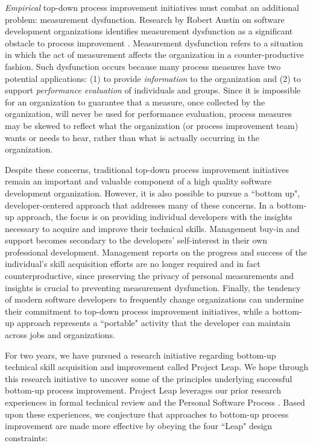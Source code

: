 {\em Empirical} top-down process improvement initiatives must combat an
additional problem: measurement dysfunction.  Research by Robert Austin on
software development organizations identifies measurement dysfunction as a
significant obstacle to process improvement \cite{Austin96}.  Measurement
dysfunction refers to a situation in which the act of measurement affects
the organization in a counter-productive fashion.  Such dysfunction occurs
because many process measures have two potential applications: (1) to
provide {\em information} to the organization and (2) to support {\em
  performance evaluation} of individuals and groups.  Since it is
impossible for an organization to guarantee that a measure, once collected
by the organization, will never be used for performance evaluation, process
measures may be skewed to reflect what the organization (or process
improvement team) wants or needs to hear, rather than what is actually
occurring in the organization.


Despite these concerns, traditional top-down process improvement
initiatives remain an important and valuable component of a high quality
software development organization.  However, it is also possible to pursue
a ``bottom up", developer-centered approach that addresses many of these
concerns. In a bottom-up approach, the focus is on providing individual
developers with the insights necessary to acquire and improve their
technical skills.  Management buy-in and support becomes secondary to the
developers' self-interest in their own professional development.
Management reports on the progress and success of the individual's skill
acquisition efforts are no longer required and in fact counterproductive,
since preserving the privacy of personal measurements and insights is
crucial to preventing measurement dysfunction.  Finally, the tendency of
modern software developers to frequently change organizations can undermine
their commitment to top-down process improvement initiatives, while a
bottom-up approach represents a ``portable" activity that the developer can
maintain across jobs and organizations.


For two years, we have pursued a research initiative regarding bottom-up
technical skill acquisition and improvement called Project Leap.  We hope
through this research initiative to uncover some of the principles
underlying successful bottom-up process improvement.  Project Leap
leverages our prior research experiences in formal technical review
\cite{Johnson98} and the Personal Software Process \cite{Disney98}.  Based
upon these experiences, we conjecture that approaches to bottom-up process
improvement are made more effective by obeying the four ``Leap" design
constraints:

